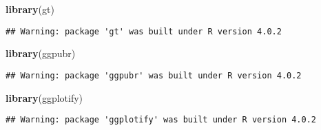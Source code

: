 \documentclass[
]{article}
\newenvironment{Shaded}{\begin{snugshade}}{\end{snugshade}}
\newcommand{\KeywordTok}[1]{\textcolor[rgb]{0.13,0.29,0.53}{\textbf{#1}}}
\newcommand{\NormalTok}[1]{#1}
\begin{document}
\begin{Shaded}
\begin{Highlighting}[]
\KeywordTok{library}\NormalTok{(gt)}
\end{Highlighting}
\end{Shaded}

\begin{verbatim}
## Warning: package 'gt' was built under R version 4.0.2
\end{verbatim}

\begin{Shaded}
\begin{Highlighting}[]
\KeywordTok{library}\NormalTok{(ggpubr)}
\end{Highlighting}
\end{Shaded}

\begin{verbatim}
## Warning: package 'ggpubr' was built under R version 4.0.2
\end{verbatim}

\begin{Shaded}
\begin{Highlighting}[]
\KeywordTok{library}\NormalTok{(ggplotify)}
\end{Highlighting}
\end{Shaded}

\begin{verbatim}
## Warning: package 'ggplotify' was built under R version 4.0.2
\end{verbatim}
\end{document}
